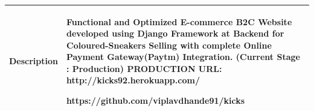 \documentclass[a4paper,10pt]{article}
\begin{document}
\begin{tabu} to 1.1\textwidth { | X[0.4] | X[3] | }

 \hline
\large  Description & Functional and Optimized E-commerce B2C Website developed using Django Framework at Backend for Coloured-Sneakers Selling with complete Online Payment Gateway(Paytm) Integration. 
\newline
 \textbf{\small(Current Stage : Production)}\newline
  \textbf{\small PRODUCTION URL: } http://kicks92.herokuapp.com/


\newline https://github.com/viplavdhande91/kicks 

\\
 

 \hline

 
\end{tabu}
 
 
 

 
 
 
 
 
 
 
 
 
 
 
 
 


   



 

 
 




 
 
\end{document}
